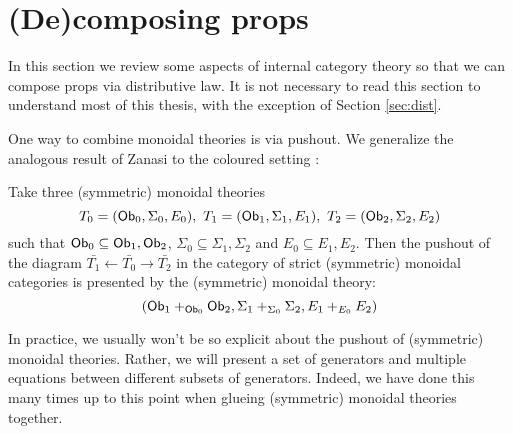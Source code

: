 \section{(De)composing props}
\label{subsec:internal}
%
%
%
%
%
%
%



In this section we review some aspects of internal category theory so that we can compose props via distributive law.  It is not necessary to read this section to understand most of this thesis, with the exception of Section \ref{sec:dist}.






One way to combine monoidal theories is via pushout.  We generalize the analogous result of Zanasi  to the coloured setting \cite[Proposition 2.51]{ih}:
\begin{lemma}
Take three (symmetric) monoidal theories
$$T_0=({\sf Ob}_0,\Sigma_0 ,E_0 ), \ T_1=({\sf Ob}_1,\Sigma_1 ,E_1 ), \ T_2=({\sf Ob}_2,\Sigma_2 ,E_2 )$$
such that ${\sf Ob}_0 \subseteq {\sf Ob}_1,{\sf Ob}_2$, $\Sigma_0 \subseteq \Sigma_1,\Sigma_2$ and $E_0 \subseteq E_1,E_2$.
Then the pushout of the diagram $\bar{T_1} \leftarrow \bar{T_0} \rightarrow \bar{T_2}$  in the category of strict (symmetric) monoidal categories is presented by the (symmetric) monoidal theory:
$$
( {\sf Ob}_1 +_{\mathsf{Ob}_0} {\sf Ob}_2, \Sigma_1 +_{\Sigma_0} \Sigma_2, E_1 +_{E_0} E_2)
$$
\end{lemma}
In practice, we usually won't be so explicit about the pushout of (symmetric) monoidal theories.  Rather, we will present a set of generators and multiple equations between different subsets of generators.  Indeed, we have done this many times up to this point when glueing (symmetric) monoidal theories together.  

